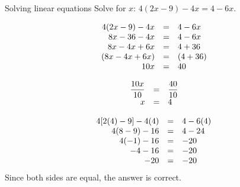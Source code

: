 \begin{wex}
{Solving linear equations }
{Solve for $x$: $4(2x-9)-4x=4-6x$.}
{

\begin{equation*}
    \begin{array}{ccl}\hfill 4(2x-9)-4x& =& 4-6x\hfill  \\ 
	\hfill 8x-36-4x& =& 4-6x\hfill   \\ 
	\hfill 8x-4x+6x& =& 4+36\hfill  \\ 
	\hfill (8x-4x+6x)& =& (4+36)\hfill   \\   
	\hfill 10x& =& 40\hfill  
    \end{array}
\end{equation*}

\begin{equation*}
    \begin{array}{ccl}
	\hfill \dfrac{10x}{10}& =& \dfrac{40}{10}\hfill\\
	\hfill x& =& 4\hfill  
    \end{array}
\end{equation*}


\begin{equation*}
    \begin{array}{ccl}\hfill 4[2(4)-9]-4(4)& =& 4-6(4)\hfill \\
	\hfill 4(8-9)-16& =& 4-24\hfill \\
	\hfill 4(-1)-16& =& -20\hfill \\
	\hfill -4-16& =& -20\hfill \\
	\hfill -20& =& -20\hfill 
    \end{array}
\end{equation*}
Since both sides are equal, the answer is correct. 
}
\end{wex}

